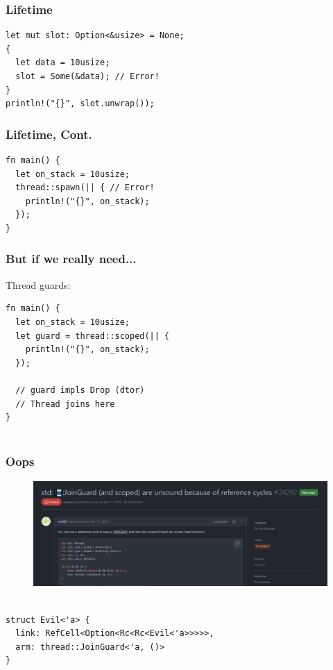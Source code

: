 \documentclass[UTF-8]{ctexbeamer}
\begin{document}
\begin{frame}[fragile]
  \frametitle{Lifetime}

  \begin{verbatim}
let mut slot: Option<&usize> = None;
{
  let data = 10usize;
  slot = Some(&data); // Error!
}
println!("{}", slot.unwrap());
  \end{verbatim}
\end{frame}

\begin{frame}[fragile]
  \frametitle{Lifetime, Cont.}

  \begin{verbatim}
fn main() {
  let on_stack = 10usize;
  thread::spawn(|| { // Error!
    println!("{}", on_stack);
  });
}
  \end{verbatim}
\end{frame}

\begin{frame}[fragile]
  \frametitle{But if we really need...}

  \pause

  Thread guards:

  \begin{verbatim}
fn main() {
  let on_stack = 10usize;
  let guard = thread::scoped(|| {
    println!("{}", on_stack);
  });

  // guard impls Drop (dtor)
  // Thread joins here
}
    
  \end{verbatim}
\end{frame}

\begin{frame}[fragile]
  \frametitle{Oops}

  \begin{figure}
    \includegraphics[width=\textwidth]{assets/thread.png}
    \caption{🧵}
  \end{figure}

  \begin{verbatim}
struct Evil<'a> {
  link: RefCell<Option<Rc<Rc<Evil<'a>>>>>,
  arm: thread::JoinGuard<'a, ()>
}
  \end{verbatim}
\end{frame}
\end{document}
